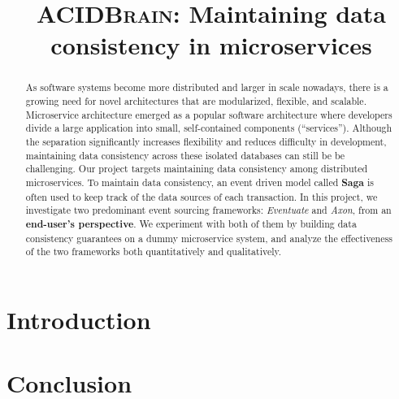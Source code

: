 \documentclass[journal,11pt,onecolumn]{assets/IEEEtran}
\begin{document}
\title{\textsc{ACIDBrain}: Maintaining data consistency in microservices}

\author{

}

\maketitle


\begin{abstract}
    As software systems become more distributed and larger in scale nowadays, there is a growing need for novel architectures that are modularized, flexible, and scalable. Microservice architecture emerged as a popular software architecture where developers divide a large application into small, self-contained components (“services”). Although the separation significantly increases flexibility and reduces difficulty in development, maintaining data consistency across these isolated databases can still be be challenging. Our project targets maintaining data consistency among distributed microservices. To maintain data consistency, an event driven model called \textbf{Saga}\cite{garcia1987sagas} is often used to keep track of the data sources of each transaction. In this project, we investigate two predominant event sourcing frameworks: \textit{Eventuate} and \textit{Axon}, from an \textbf{end-user’s perspective}. We experiment with both of them by building data consistency guarantees on a dummy microservice system, and analyze the effectiveness of the two frameworks both quantitatively and qualitatively.
\end{abstract}



\section{Introduction}


\section{Conclusion}



\FloatBarrier{}



\end{document}
